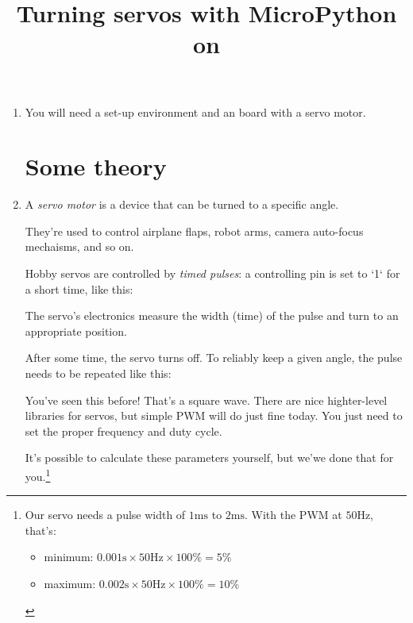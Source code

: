 \documentclass{../tutorial}
\title{Turning servos with MicroPython on \abbr{ESP32}}
\begin{document}
\begin{enumerate}

\item
    You will need a set-up environment and an \ESP board
    with a servo motor.

\section{Some theory}

\item
    A \emph{servo motor} is a device that can be turned to a specific angle.

    They're used to control airplane flaps, robot arms,
    camera auto-focus mechaisms, and so on.

    Hobby servos are controlled by \emph{timed pulses}: a controlling pin is
    set to `1` for a short time, like this:

    \begin{figure}[h]
        \centering
    \end{figure}

    \begin{figure}[h]
        \centering
    \end{figure}

    The servo's electronics measure the width (time) of the pulse and
    turn to an appropriate position.

    After some time, the servo turns off.
    To reliably keep a given angle,
    the pulse needs to be repeated like this:

    \begin{figure}[h]
        \centering
    \end{figure}

    You've seen this before! That's a square wave.
    There are nice highter-level libraries for servos,
    but simple PWM will do just fine today.
    You just need to set the proper frequency and duty cycle.

    It's possible to calculate these parameters yourself, but we'we done that
    for you.\footnote{
        Our servo needs a pulse width of
        $1 \si{\milli\second}$ to $2 \si{\milli\second}$.
        With the PWM at $50 \si{\hertz}$, that's:

        \begin{itemize}
        \item minimum:
            ${0.001 \si{\second}} \times {50 \si{\hertz}} \times 100\% = 5\%$
        \item maximum:
            ${0.002 \si{\second}} \times {50 \si{\hertz}} \times 100\% = 10\%$
        \end{itemize}

}
\end{enumerate}
\end{document}

